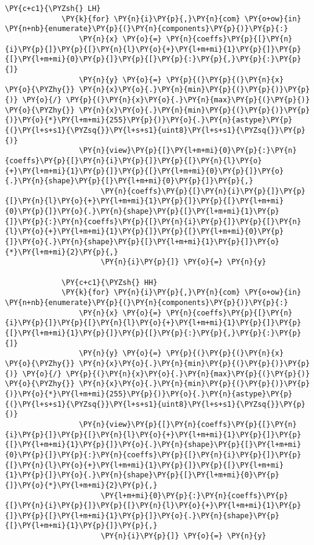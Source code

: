 \begin{Verbatim}[commandchars=\\\{\}]
             \PY{c+c1}{\PYZsh{} LH}
             \PY{k}{for} \PY{n}{i}\PY{p}{,}\PY{n}{com} \PY{o+ow}{in} \PY{n+nb}{enumerate}\PY{p}{(}\PY{n}{components}\PY{p}{)}\PY{p}{:}
                 \PY{n}{x} \PY{o}{=} \PY{n}{coeffs}\PY{p}{[}\PY{n}{i}\PY{p}{]}\PY{p}{[}\PY{n}{l}\PY{o}{+}\PY{l+m+mi}{1}\PY{p}{]}\PY{p}{[}\PY{l+m+mi}{0}\PY{p}{]}\PY{p}{[}\PY{p}{:}\PY{p}{,}\PY{p}{:}\PY{p}{]}
                 \PY{n}{y} \PY{o}{=} \PY{p}{(}\PY{p}{(}\PY{n}{x} \PY{o}{\PYZhy{}} \PY{n}{x}\PY{o}{.}\PY{n}{min}\PY{p}{(}\PY{p}{)}\PY{p}{)} \PY{o}{/} \PY{p}{(}\PY{n}{x}\PY{o}{.}\PY{n}{max}\PY{p}{(}\PY{p}{)} \PY{o}{\PYZhy{}} \PY{n}{x}\PY{o}{.}\PY{n}{min}\PY{p}{(}\PY{p}{)}\PY{p}{)}\PY{o}{*}\PY{l+m+mi}{255}\PY{p}{)}\PY{o}{.}\PY{n}{astype}\PY{p}{(}\PY{l+s+s1}{\PYZsq{}}\PY{l+s+s1}{uint8}\PY{l+s+s1}{\PYZsq{}}\PY{p}{)}
                 \PY{n}{view}\PY{p}{[}\PY{l+m+mi}{0}\PY{p}{:}\PY{n}{coeffs}\PY{p}{[}\PY{n}{i}\PY{p}{]}\PY{p}{[}\PY{n}{l}\PY{o}{+}\PY{l+m+mi}{1}\PY{p}{]}\PY{p}{[}\PY{l+m+mi}{0}\PY{p}{]}\PY{o}{.}\PY{n}{shape}\PY{p}{[}\PY{l+m+mi}{0}\PY{p}{]}\PY{p}{,}
                      \PY{n}{coeffs}\PY{p}{[}\PY{n}{i}\PY{p}{]}\PY{p}{[}\PY{n}{l}\PY{o}{+}\PY{l+m+mi}{1}\PY{p}{]}\PY{p}{[}\PY{l+m+mi}{0}\PY{p}{]}\PY{o}{.}\PY{n}{shape}\PY{p}{[}\PY{l+m+mi}{1}\PY{p}{]}\PY{p}{:}\PY{n}{coeffs}\PY{p}{[}\PY{n}{i}\PY{p}{]}\PY{p}{[}\PY{n}{l}\PY{o}{+}\PY{l+m+mi}{1}\PY{p}{]}\PY{p}{[}\PY{l+m+mi}{0}\PY{p}{]}\PY{o}{.}\PY{n}{shape}\PY{p}{[}\PY{l+m+mi}{1}\PY{p}{]}\PY{o}{*}\PY{l+m+mi}{2}\PY{p}{,}
                      \PY{n}{i}\PY{p}{]} \PY{o}{=} \PY{n}{y}
         
             \PY{c+c1}{\PYZsh{} HH}
             \PY{k}{for} \PY{n}{i}\PY{p}{,}\PY{n}{com} \PY{o+ow}{in} \PY{n+nb}{enumerate}\PY{p}{(}\PY{n}{components}\PY{p}{)}\PY{p}{:}
                 \PY{n}{x} \PY{o}{=} \PY{n}{coeffs}\PY{p}{[}\PY{n}{i}\PY{p}{]}\PY{p}{[}\PY{n}{l}\PY{o}{+}\PY{l+m+mi}{1}\PY{p}{]}\PY{p}{[}\PY{l+m+mi}{1}\PY{p}{]}\PY{p}{[}\PY{p}{:}\PY{p}{,}\PY{p}{:}\PY{p}{]}
                 \PY{n}{y} \PY{o}{=} \PY{p}{(}\PY{p}{(}\PY{n}{x} \PY{o}{\PYZhy{}} \PY{n}{x}\PY{o}{.}\PY{n}{min}\PY{p}{(}\PY{p}{)}\PY{p}{)} \PY{o}{/} \PY{p}{(}\PY{n}{x}\PY{o}{.}\PY{n}{max}\PY{p}{(}\PY{p}{)} \PY{o}{\PYZhy{}} \PY{n}{x}\PY{o}{.}\PY{n}{min}\PY{p}{(}\PY{p}{)}\PY{p}{)}\PY{o}{*}\PY{l+m+mi}{255}\PY{p}{)}\PY{o}{.}\PY{n}{astype}\PY{p}{(}\PY{l+s+s1}{\PYZsq{}}\PY{l+s+s1}{uint8}\PY{l+s+s1}{\PYZsq{}}\PY{p}{)}
                 \PY{n}{view}\PY{p}{[}\PY{n}{coeffs}\PY{p}{[}\PY{n}{i}\PY{p}{]}\PY{p}{[}\PY{n}{l}\PY{o}{+}\PY{l+m+mi}{1}\PY{p}{]}\PY{p}{[}\PY{l+m+mi}{1}\PY{p}{]}\PY{o}{.}\PY{n}{shape}\PY{p}{[}\PY{l+m+mi}{0}\PY{p}{]}\PY{p}{:}\PY{n}{coeffs}\PY{p}{[}\PY{n}{i}\PY{p}{]}\PY{p}{[}\PY{n}{l}\PY{o}{+}\PY{l+m+mi}{1}\PY{p}{]}\PY{p}{[}\PY{l+m+mi}{1}\PY{p}{]}\PY{o}{.}\PY{n}{shape}\PY{p}{[}\PY{l+m+mi}{0}\PY{p}{]}\PY{o}{*}\PY{l+m+mi}{2}\PY{p}{,}
                      \PY{l+m+mi}{0}\PY{p}{:}\PY{n}{coeffs}\PY{p}{[}\PY{n}{i}\PY{p}{]}\PY{p}{[}\PY{n}{l}\PY{o}{+}\PY{l+m+mi}{1}\PY{p}{]}\PY{p}{[}\PY{l+m+mi}{1}\PY{p}{]}\PY{o}{.}\PY{n}{shape}\PY{p}{[}\PY{l+m+mi}{1}\PY{p}{]}\PY{p}{,}
                      \PY{n}{i}\PY{p}{]} \PY{o}{=} \PY{n}{y}
         

\end{Verbatim}
